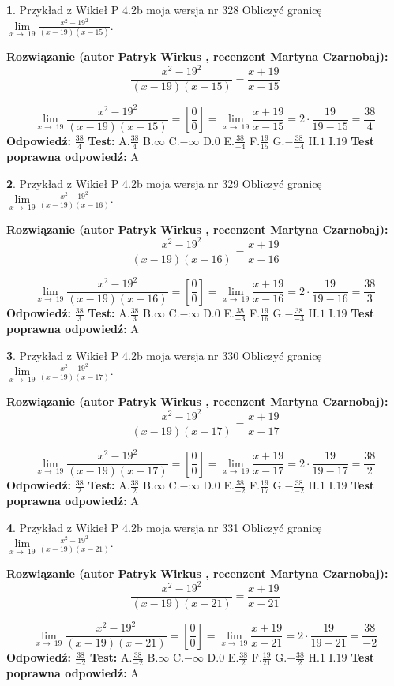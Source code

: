 \documentclass[12pt, a4paper]{article}
\theoremstyle{definition} %
\newtheorem{zad}{}
\newcommand{\zadStart}[1]{\begin{zad}#1\newline}
\newcommand{\zadStop}{\end{zad}}
\newcommand{\rozwStart}[2]{\noindent \textbf{Rozwiązanie (autor #1 , recenzent #2): }\newline}
\newcommand{\rozwStop}{\newline}
\newcommand{\odpStart}{\noindent \textbf{Odpowiedź:}\newline}
\newcommand{\odpStop}{\newline}
\newcommand{\testStart}{\noindent \textbf{Test:}\newline}
\newcommand{\testStop}{\newline}
\newcommand{\kluczStart}{\noindent \textbf{Test poprawna odpowiedź:}\newline}
\newcommand{\kluczStop}{\newline}
\begin{document}
\zadStart{Przykład z Wikieł P 4.2b moja wersja nr 328}
Obliczyć granicę $\lim\limits_{x\to\ 19}\frac{x^{2}-19^{2}}{(x-19)(x-15)}$.
\zadStop
\rozwStart{Patryk Wirkus}{Martyna Czarnobaj}
$$\frac{x^{2}-19^{2}}{(x-19)(x-15)}=\frac{x+19}{x-15}$$

$$\lim\limits_{x\to\ 19}\frac{x^{2}-19^{2}}{(x-19)(x-15)}=[\frac{0}{0}]=\lim\limits_{x\to\ 19}\frac{x+19}{x-15}=2 \cdot \frac{19}{19-15} = \frac{38}{4}$$
\rozwStop
\odpStart
$\frac{38}{4}$
\odpStop
\testStart
A.$\frac{38}{4}$
B.$\infty$
C.$-\infty$
D.$0$
E.$\frac{38}{-4}$
F.$\frac{19}{15}$
G.$-\frac{38}{-4}$
H.$1$
I.$19$
\testStop
\kluczStart
A
\kluczStop



\zadStart{Przykład z Wikieł P 4.2b moja wersja nr 329}
Obliczyć granicę $\lim\limits_{x\to\ 19}\frac{x^{2}-19^{2}}{(x-19)(x-16)}$.
\zadStop
\rozwStart{Patryk Wirkus}{Martyna Czarnobaj}
$$\frac{x^{2}-19^{2}}{(x-19)(x-16)}=\frac{x+19}{x-16}$$

$$\lim\limits_{x\to\ 19}\frac{x^{2}-19^{2}}{(x-19)(x-16)}=[\frac{0}{0}]=\lim\limits_{x\to\ 19}\frac{x+19}{x-16}=2 \cdot \frac{19}{19-16} = \frac{38}{3}$$
\rozwStop
\odpStart
$\frac{38}{3}$
\odpStop
\testStart
A.$\frac{38}{3}$
B.$\infty$
C.$-\infty$
D.$0$
E.$\frac{38}{-3}$
F.$\frac{19}{16}$
G.$-\frac{38}{-3}$
H.$1$
I.$19$
\testStop
\kluczStart
A
\kluczStop



\zadStart{Przykład z Wikieł P 4.2b moja wersja nr 330}
Obliczyć granicę $\lim\limits_{x\to\ 19}\frac{x^{2}-19^{2}}{(x-19)(x-17)}$.
\zadStop
\rozwStart{Patryk Wirkus}{Martyna Czarnobaj}
$$\frac{x^{2}-19^{2}}{(x-19)(x-17)}=\frac{x+19}{x-17}$$

$$\lim\limits_{x\to\ 19}\frac{x^{2}-19^{2}}{(x-19)(x-17)}=[\frac{0}{0}]=\lim\limits_{x\to\ 19}\frac{x+19}{x-17}=2 \cdot \frac{19}{19-17} = \frac{38}{2}$$
\rozwStop
\odpStart
$\frac{38}{2}$
\odpStop
\testStart
A.$\frac{38}{2}$
B.$\infty$
C.$-\infty$
D.$0$
E.$\frac{38}{-2}$
F.$\frac{19}{17}$
G.$-\frac{38}{-2}$
H.$1$
I.$19$
\testStop
\kluczStart
A
\kluczStop



\zadStart{Przykład z Wikieł P 4.2b moja wersja nr 331}
Obliczyć granicę $\lim\limits_{x\to\ 19}\frac{x^{2}-19^{2}}{(x-19)(x-21)}$.
\zadStop
\rozwStart{Patryk Wirkus}{Martyna Czarnobaj}
$$\frac{x^{2}-19^{2}}{(x-19)(x-21)}=\frac{x+19}{x-21}$$

$$\lim\limits_{x\to\ 19}\frac{x^{2}-19^{2}}{(x-19)(x-21)}=[\frac{0}{0}]=\lim\limits_{x\to\ 19}\frac{x+19}{x-21}=2 \cdot \frac{19}{19-21} = \frac{38}{-2}$$
\rozwStop
\odpStart
$\frac{38}{-2}$
\odpStop
\testStart
A.$\frac{38}{-2}$
B.$\infty$
C.$-\infty$
D.$0$
E.$\frac{38}{2}$
F.$\frac{19}{21}$
G.$-\frac{38}{2}$
H.$1$
I.$19$
\testStop
\kluczStart
A
\kluczStop
\end{document}
